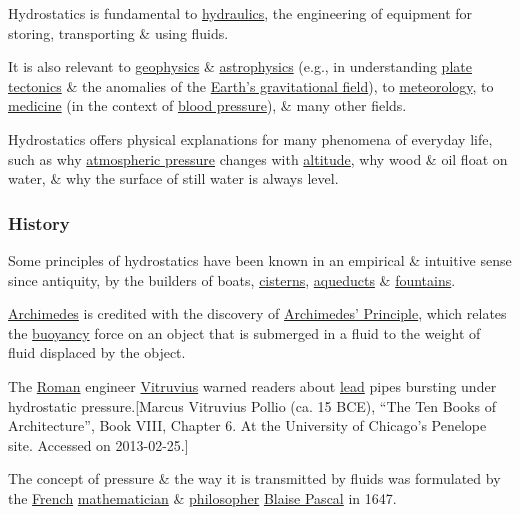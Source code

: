 \documentclass{article}
\begin{document}
%
Hydrostatics is fundamental to \href{https://en.wikipedia.org/wiki/Hydraulics}{hydraulics}, the engineering of equipment for storing, transporting \& using fluids.

It is also relevant to \href{https://en.wikipedia.org/wiki/Geophysics}{geophysics} \& \href{https://en.wikipedia.org/wiki/Astrophysics}{astrophysics} (e.g., in understanding \href{https://en.wikipedia.org/wiki/Plate_tectonics}{plate tectonics} \& the anomalies of the \href{https://en.wikipedia.org/wiki/Gravity_of_Earth}{Earth's gravitational field}), to \href{https://en.wikipedia.org/wiki/Meteorology}{meteorology}, to \href{https://en.wikipedia.org/wiki/Medicine}{medicine} (in the context of \href{https://en.wikipedia.org/wiki/Blood_pressure}{blood pressure}), \& many other fields.

%
Hydrostatics offers physical explanations for many phenomena of everyday life, such as why \href{https://en.wikipedia.org/wiki/Atmospheric_pressure}{atmospheric pressure} changes with \href{https://en.wikipedia.org/wiki/Altitude}{altitude}, why wood \& oil float on water, \& why the surface of still water is always level.

\subsubsection{History}
Some principles of hydrostatics have been known in an empirical \& intuitive sense since antiquity, by the builders of boats, \href{https://en.wikipedia.org/wiki/Cistern}{cisterns}, \href{https://en.wikipedia.org/wiki/Aqueduct_(water_supply)}{aqueducts} \& \href{https://en.wikipedia.org/wiki/Fountain}{fountains}.

\href{https://en.wikipedia.org/wiki/Archimedes}{Archimedes} is credited with the discovery of \href{https://en.wikipedia.org/wiki/Archimedes'_Principle}{Archimedes' Principle}, which relates the \href{https://en.wikipedia.org/wiki/Buoyancy}{buoyancy} force on an object that is submerged in a fluid to the weight of fluid displaced by the object.

The \href{https://en.wikipedia.org/wiki/Roman_Empire}{Roman} engineer \href{https://en.wikipedia.org/wiki/Vitruvius}{Vitruvius} warned readers about \href{https://en.wikipedia.org/wiki/Lead}{lead} pipes bursting under hydrostatic pressure.[Marcus Vitruvius Pollio (ca. 15 BCE), ``The Ten Books of Architecture'', Book VIII, Chapter 6. At the University of Chicago's Penelope site. Accessed on 2013-02-25.]

%
The concept of pressure \& the way it is transmitted by fluids was formulated by the \href{https://en.wikipedia.org/wiki/France}{French} \href{https://en.wikipedia.org/wiki/Mathematician}{mathematician} \& \href{https://en.wikipedia.org/wiki/Philosopher}{philosopher} \href{https://en.wikipedia.org/wiki/Blaise_Pascal}{Blaise Pascal} in 1647.
\end{document}
